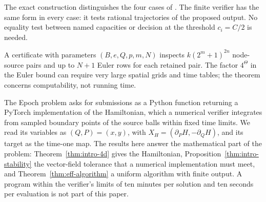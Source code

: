 \begin{remark}\label{rem:eff-branches}
The exact construction distinguishes the four cases of
. The finite verifier has the same form in every
case: it tests rational trajectories of the proposed output. No equality test
between named capacities or decision at the threshold $c_i=C/2$ is needed.
\end{remark}

\begin{remark}[Size]\label{rem:eff-size}
A certificate with parameters $(B,e,Q,p,m,N)$ inspects $k(2^m+1)^{2n}$ node-source pairs and up to $N+1$ Euler
rows for each retained pair. The factor $4^\Theta$ in the Euler bound can require very large spatial grids and
time tables; the theorem concerns computability, not running time.
\end{remark}

\begin{remark}\label{rem:eff-epoch-interface}
The Epoch problem \cite{Epoch} asks for submissions as a Python function returning a PyTorch implementation of the
Hamiltonian, which a numerical verifier integrates from sampled boundary points of the source balls within fixed time
limits. We read its variables as $(Q,P)=(x,y)$, with $X_H=(\partial_PH,-\partial_QH)$, and its target as the
time-one map. The results here answer the mathematical part of the problem: Theorem~\ref{thm:intro-4d} gives the
Hamiltonian, Proposition~\ref{thm:intro-stability} the vector-field tolerance that a numerical implementation must
meet, and Theorem~\ref{thm:eff-algorithm} a uniform algorithm with finite output. A program within the verifier's
limits of ten minutes per solution and ten seconds per evaluation is not part of this paper.
\end{remark}
